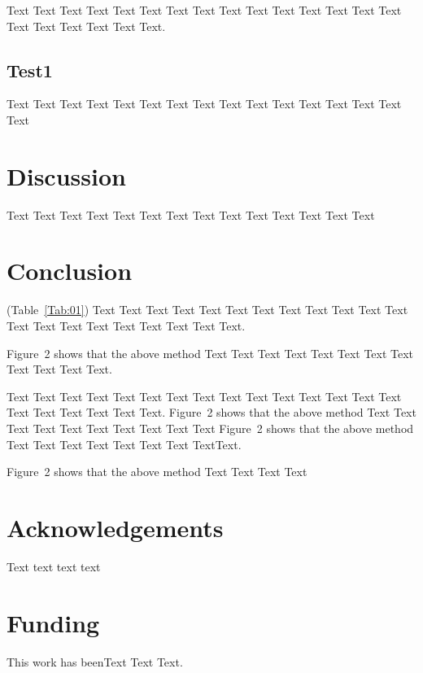 \documentclass{bioinfo}
\begin{document}
Text Text Text Text Text Text  Text Text Text Text Text Text Text
Text Text  Text Text Text Text Text Text.


\subsection{Test1}

Text Text Text Text Text Text  Text Text Text Text Text Text Text
Text Text  Text

\section{Discussion}

Text Text Text Text Text Text  Text Text Text Text Text Text Text
Text


\section{Conclusion}

(Table~\ref{Tab:01}) Text Text Text Text Text Text  Text Text Text
Text Text Text Text Text Text  Text Text Text Text Text Text.

Figure~2\vphantom{\ref{fig:02}} shows that the above method  Text
Text Text Text  Text Text Text Text Text Text  Text Text.

Text Text Text Text Text Text Text Text Text Text Text Text Text
Text Text Text Text Text Text Text Text.
Figure~2\vphantom{\ref{fig:02}} shows\vadjust{\pagebreak} that the
above method  Text Text Text Text Text Text Text Text Text Text
Figure~2\vphantom{\ref{fig:02}} shows that the above method  Text
Text Text Text Text Text Text Text\break Text.

Figure~2\vphantom{\ref{fig:02}} shows that the above method  Text
Text Text Text\vspace*{-10pt}


\section*{Acknowledgements}

Text
text text text\vspace*{-12pt}

\section*{Funding}

This work has beenText  Text Text.\vspace*{-12pt}


%
%
%
%
%
%
%

\end{document}
